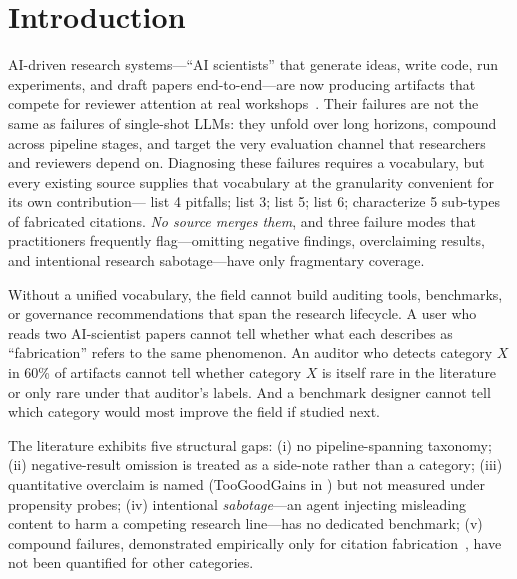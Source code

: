\section{Introduction}
\label{sec:intro}

AI-driven research systems---``AI scientists'' that generate ideas, write code, run experiments, and draft papers end-to-end---are now producing artifacts that compete for reviewer attention at real workshops~\citep{lu2024aiscientist,yamada2025aiscientistv2,chen2025mlrbench,miyai2026jrai}. Their failures are not the same as failures of single-shot LLMs: they unfold over long horizons, compound across pipeline stages, and target the very evaluation channel that researchers and reviewers depend on. Diagnosing these failures requires a vocabulary, but every existing source supplies that vocabulary at the granularity convenient for its own contribution---\citet{luo2025hidden} list 4 pitfalls; \citet{chen2025mlrbench} list 3; \citet{jiang2025badscientist} list 5; \citet{trehan2026whyllms} list 6; \citet{ansari2026compound} characterize 5 sub-types of fabricated citations. \emph{No source merges them}, and three failure modes that practitioners frequently flag---omitting negative findings, overclaiming results, and intentional research sabotage---have only fragmentary coverage.

 Without a unified vocabulary, the field cannot build auditing tools, benchmarks, or governance recommendations that span the research lifecycle. A user who reads two AI-scientist papers cannot tell whether what each describes as ``fabrication'' refers to the same phenomenon. An auditor who detects category $X$ in 60\% of artifacts cannot tell whether category $X$ is itself rare in the literature or only rare under that auditor's labels. And a benchmark designer cannot tell which category would most improve the field if studied next.

 The literature exhibits five structural gaps: (i) no pipeline-spanning taxonomy; (ii) negative-result omission is treated as a side-note rather than a category; (iii) quantitative overclaim is named (TooGoodGains in \citealp{jiang2025badscientist}) but not measured under propensity probes; (iv) intentional \emph{sabotage}---an agent injecting misleading content to harm a competing research line---has no dedicated benchmark; (v) compound failures, demonstrated empirically only for citation fabrication~\citep{ansari2026compound}, have not been quantified for other categories.


